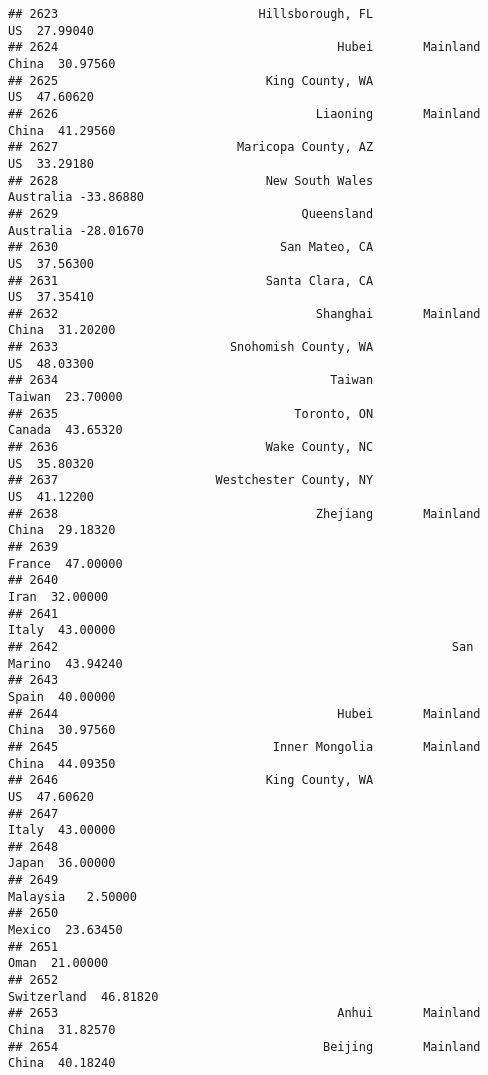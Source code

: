 \documentclass[
]{article}
\begin{document}
\begin{verbatim}
## 2623                            Hillsborough, FL                   US  27.99040
## 2624                                       Hubei       Mainland China  30.97560
## 2625                             King County, WA                   US  47.60620
## 2626                                    Liaoning       Mainland China  41.29560
## 2627                         Maricopa County, AZ                   US  33.29180
## 2628                             New South Wales            Australia -33.86880
## 2629                                  Queensland            Australia -28.01670
## 2630                               San Mateo, CA                   US  37.56300
## 2631                             Santa Clara, CA                   US  37.35410
## 2632                                    Shanghai       Mainland China  31.20200
## 2633                        Snohomish County, WA                   US  48.03300
## 2634                                      Taiwan               Taiwan  23.70000
## 2635                                 Toronto, ON               Canada  43.65320
## 2636                             Wake County, NC                   US  35.80320
## 2637                      Westchester County, NY                   US  41.12200
## 2638                                    Zhejiang       Mainland China  29.18320
## 2639                                                           France  47.00000
## 2640                                                             Iran  32.00000
## 2641                                                            Italy  43.00000
## 2642                                                       San Marino  43.94240
## 2643                                                            Spain  40.00000
## 2644                                       Hubei       Mainland China  30.97560
## 2645                              Inner Mongolia       Mainland China  44.09350
## 2646                             King County, WA                   US  47.60620
## 2647                                                            Italy  43.00000
## 2648                                                            Japan  36.00000
## 2649                                                         Malaysia   2.50000
## 2650                                                           Mexico  23.63450
## 2651                                                             Oman  21.00000
## 2652                                                      Switzerland  46.81820
## 2653                                       Anhui       Mainland China  31.82570
## 2654                                     Beijing       Mainland China  40.18240

\end{verbatim}
\end{document}
